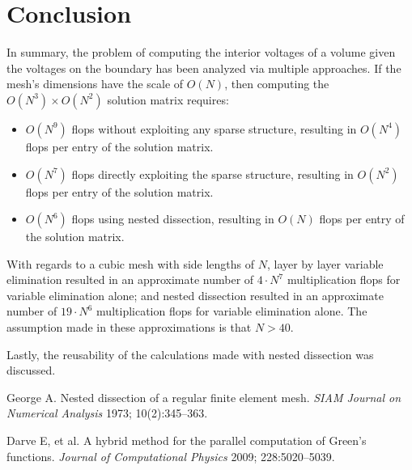 \documentclass{article}
\begin{document}
\section{Conclusion} 

In summary, the problem of computing the interior voltages of a volume given the voltages on the boundary has been analyzed via multiple approaches. If the mesh's dimensions have the scale of \(O(N)\), then computing the \(O(N^3) \times O(N^2)\) solution matrix requires: 
\begin{itemize}
\item \(O(N^9)\) flops without exploiting any sparse structure, resulting in \(O(N^4)\) flops per entry of the solution matrix.
\item \(O(N^7)\) flops directly exploiting the sparse structure, resulting in \(O(N^2)\) flops per entry of the solution matrix. 
\item \(O(N^6)\) flops using nested dissection, resulting in \(O(N)\) flops per entry of the solution matrix.
\end{itemize}

With regards to a cubic mesh with side lengths of \(N\), layer by layer variable elimination resulted in an approximate number of \(4 \cdot N^7\) multiplication flops for variable elimination alone; and nested dissection resulted in an approximate number of \(19 \cdot N^6\) multiplication flops for variable elimination alone. The assumption made in these approximations is that \(N > 40\).  

Lastly, the reusability of the calculations made with nested dissection was discussed. 



\begin{thebibliography}{9}

\bibitem{[George1973]}
George A. Nested dissection of a regular finite element mesh. \emph{SIAM Journal on Numerical Analysis} 1973; 10(2):345–363.

\bibitem{[Darve2009]}
Darve E, et al. A hybrid method for the parallel computation of Green’s functions. \emph{Journal of Computational Physics} 2009; 228:5020–5039.

\end{thebibliography}
\end{document}
